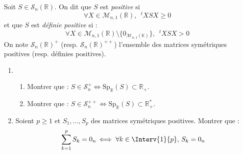 \documentclass[a4paper,10pt]{report}
\begin{document}
\begin{Exa} Soit $S \in \mathcal{S}_n(\mathbb{R})$. On dit que $S$ est \textit{positive} si
$$ \forall X \in \mathcal{M}_{n,1}(\mathbb{R}), \; ~^tX S X \geq 0$$
et que $S$ est \textit{définie positive} si :
$$ \forall X \in \mathcal{M}_{n,1}(\mathbb{R}) \setminus \lbrace 0_{\mathcal{M}_{n,1}(\mathbb{K})} \rbrace, \; ~^tX S X > 0$$
On note $\mathcal{S}_n(\mathbb{R})^+$ (resp. $\mathcal{S}_n(\mathbb{R})^{++}$) l'ensemble des matrices symétriques positives (resp. définies positives).

\begin{enumerate}
\item 
\begin{enumerate}
\item Montrer que : $S \in \mathcal{S}_n^+ \Longleftrightarrow \textrm{Sp}_{\mathbb{R}}(S) \subset \mathbb{R}_+$.
\item Montrer que : $S \in \mathcal{S}_n^{++} \Longleftrightarrow \textrm{Sp}_{\mathbb{R}}(S) \subset \mathbb{R}_+^{*}$.
\end{enumerate}
\item Soient $p \geq 1$ et $S_1, \ldots, S_p$ des matrices symétriques positives. Montrer que :
$$ \sum_{k=1}^p S_k = 0_n  \, \Longleftrightarrow \;  \forall k \in \Interv{1}{p}, \, S_k = 0_n $$
\end{enumerate}
\end{Exa}

\corr 
\end{document}

